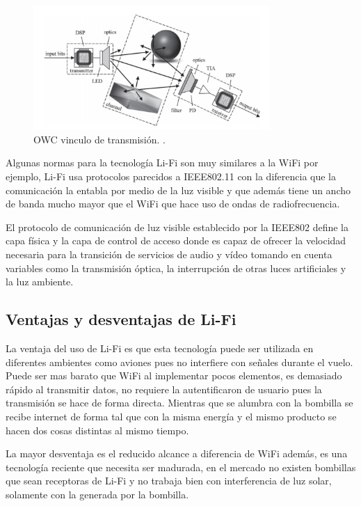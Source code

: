 \documentclass[10pt,journal,compsoc]{IEEEtran}
\begin{document}
\begin{figure}[h]
    \centering
    \includegraphics[width=9cm]{lifi2}
    \caption{OWC vinculo de transmisión. \cite{dimitroy}.}
    \label{fig:base-station}
\end{figure}

Algunas normas para la tecnología Li-Fi son muy similares a la WiFi por ejemplo, Li-Fi usa protocolos parecidos a IEEE802.11 con la diferencia que la comunicación la entabla por medio de la luz visible y que además tiene un ancho de banda mucho mayor que el WiFi que hace uso de ondas de radiofrecuencia.

El protocolo de comunicación de luz visible establecido por la IEEE802 define la capa física y la capa de control de acceso donde es capaz de ofrecer la velocidad necesaria para la transición de servicios de audio y vídeo tomando en cuenta variables como la transmisión óptica, la interrupción de otras luces artificiales y la  luz ambiente. 


\subsection{Ventajas y desventajas de Li-Fi}

La ventaja del uso de Li-Fi es que esta tecnología puede ser utilizada en diferentes ambientes como aviones pues no interfiere con señales durante el vuelo. Puede ser mas barato que WiFi al implementar pocos elementos, es demasiado rápido al transmitir datos, no requiere la autentificaron de usuario pues la transmisión se hace de forma directa. Mientras que se alumbra con la bombilla se recibe internet de forma tal que con la misma energía y el mismo producto se hacen dos cosas distintas al mismo tiempo.

La mayor desventaja es el reducido alcance a diferencia de WiFi además, es una tecnología reciente que necesita ser madurada, en el mercado no existen bombillas que sean receptoras de Li-Fi y no trabaja bien con interferencia de luz solar, solamente con la generada por la bombilla.
\end{document}
